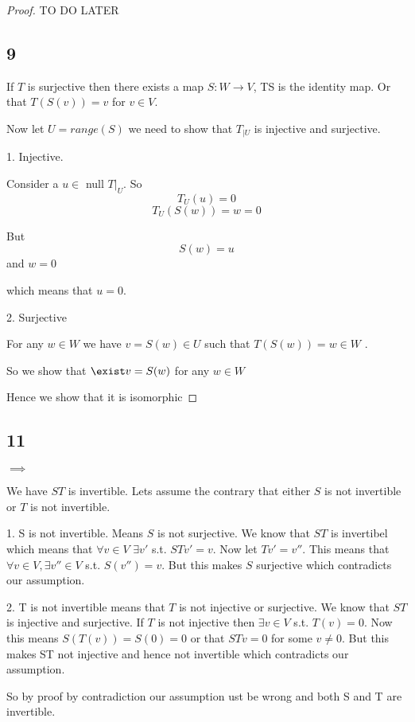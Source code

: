 \documentclass[a4paper]{report}
\begin{document}
\begin{proof}
TO DO LATER 
\subsection*{9}
If $T$ is surjective then there exists a map $S:W \rightarrow V$, TS is the identity map. Or that $T(S(v)) = v$ for  $v \in V$.

Now let  $U = range(S)$ we need to show that  $T_{|U}$ is injective and surjective.

1. Injective.

Consider a $u \in $ null $T|_U$. So $$T_U(u) = 0$$ $$ T_U(S(w)) = w = 0$$

But 
$$ S(w) = u $$  and $w = 0$ 

which means that $u = 0$.

2. Surjective

For any $w \in W$ we have $v = S(w) \in U$ such that $T(S(w)) = w \in W$ .

So we show that  $\exist v = S(w)$ for any $w \in W$ 

Hence we show that it is isomorphic

\end{proof}

\subsection*{11}
$\implies$

We have $ST$ is invertible. Lets assume the contrary that either $S$ is not invertible or $T$ is not invertible.

1. S is not invertible. Means $S$ is not surjective. We know that  $ST$ is invertibel which means that $\forall v \in V$ $\exists v'$ s.t. $STv' = v$. Now let  $Tv' = v''$. This means that $\forall v \in V, \exists v'' \in V $  s.t. $S(v'') = v$. But this makes $S$ surjective which contradicts our assumption.

2. T is not invertible means that $T$ is not injective or surjective. We know that $ST$ is injective and surjective. If $T$ is not injective then $\exists v\in V$ s.t. $T(v) = 0$. Now this means  $S(T(v)) = S(0) = 0$ or that  $STv = 0$ for some $v \ne 0$. But this makes ST not injective and hence not invertible which contradicts our assumption.  

So by proof by contradiction our assumption ust be wrong and both S and T are invertible.
\end{document}
